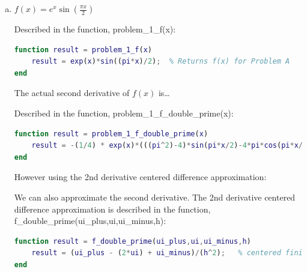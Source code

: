 \documentclass[10pt,letterpaper]{article}
\begin{document}
\begin{enumerate}[a)]
  \item 
  $f(x) = e^x \sin(\frac{\pi x}{2})$


    Described in the function, problem\_1\_f(x):
    
      \begin{lstlisting}[language = Matlab]
function result = problem_1_f(x)
    result = exp(x)*sin((pi*x)/2);  % Returns f(x) for Problem A
end \end{lstlisting}
    
    The actual second derivative of $f(x)$ is\ldots


    Described in the function, problem\_1\_f\_double\_prime(x):
     \begin{lstlisting}[language = Matlab]
function result = problem_1_f_double_prime(x)
    result = -(1/4) * exp(x)*(((pi^2)-4)*sin(pi*x/2)-4*pi*cos(pi*x/2)); % Returns actual f"(x) for Problem A
end \end{lstlisting}


    However using the 2nd derivative centered difference approximation:
    
    
    We can also approximate the second derivative. The 2nd derivative centered difference approximation is described in the function, f\_double\_prime(ui\_plus,ui,ui\_minus,h):

     \begin{lstlisting}[language = Matlab]
function result = f_double_prime(ui_plus,ui,ui_minus,h)
    result = (ui_plus - (2*ui) + ui_minus)/(h^2);   % centered finite difference approximation of f"(x)
end\end{lstlisting}



\end{enumerate}
\end{document}
